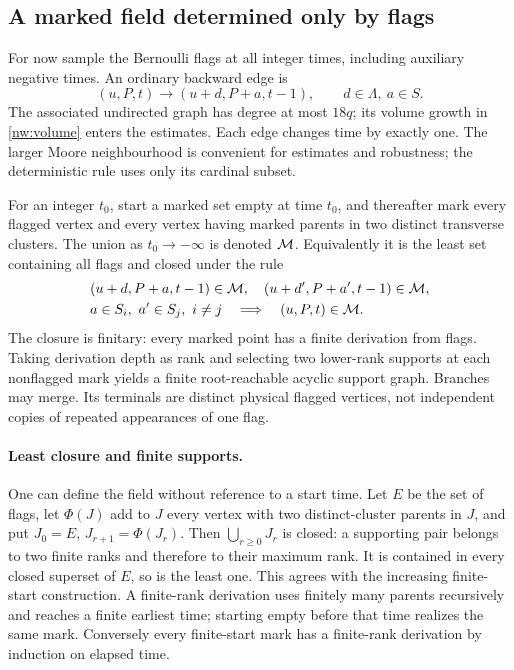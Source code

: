 \subsection{A marked field determined only by flags}

For now sample the Bernoulli flags at all integer times, including auxiliary negative times. An ordinary backward edge is
\begin{equation}\label{nw:edge}
 (u,P,t)\longrightarrow(u+d,P+a,t-1),
 \qquad d\in\Lambda,\ a\in S.
\end{equation}
The associated undirected graph has degree at most $18q$; its volume growth in \cref{nw:volume} enters the estimates. Each edge changes time by exactly one. The larger Moore neighbourhood is convenient for estimates and robustness; the deterministic rule uses only its cardinal subset.

For an integer $t_0$, start a marked set empty at time $t_0$, and thereafter mark every flagged vertex and every vertex having marked parents in two distinct transverse clusters. The union as $t_0\to-\infty$ is denoted $\mathcal M$. Equivalently it is the least set containing all flags and closed under the rule
\begin{equation}\label{nw:mark}
 \begin{split}
 &(u+d,P+a,t-1)\in\mathcal M,\quad
 (u+d',P+a',t-1)\in\mathcal M,\\
 &a\in S_i,\ a'\in S_j,\ i\ne j
 \quad\Longrightarrow\quad (u,P,t)\in\mathcal M.
 \end{split}
\end{equation}
The closure is finitary: every marked point has a finite derivation from flags. Taking derivation depth as rank and selecting two lower-rank supports at each nonflagged mark yields a finite root-reachable acyclic support graph. Branches may merge. Its terminals are distinct physical flagged vertices, not independent copies of repeated appearances of one flag.

\paragraph{Least closure and finite supports.}
One can define the field without reference to a start time. Let $E$ be the set of flags, let $\Phi(J)$ add to $J$ every vertex with two distinct-cluster parents in $J$, and put $J_0=E$, $J_{r+1}=\Phi(J_r)$. Then $\bigcup_{r\ge0}J_r$ is closed: a supporting pair belongs to two finite ranks and therefore to their maximum rank. It is contained in every closed superset of $E$, so is the least one. This agrees with the increasing finite-start construction. A finite-rank derivation uses finitely many parents recursively and reaches a finite earliest time; starting empty before that time realizes the same mark. Conversely every finite-start mark has a finite-rank derivation by induction on elapsed time.

